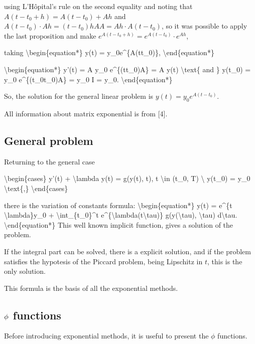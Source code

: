 \documentclass[letterpaper,10pt,english]{jupyterBook}
\begin{document}
\sphinxAtStartPar
using L’Hôpital’s rule on the second equality and noting that \(A(t-t_0+h) = A(t-t_0)+Ah\) and \(A(t-t_0) \cdot Ah = (t-t_0)hAA = Ah \cdot A(t-t_0)\), so it was possible to apply the last proposition and make \(e^{A(t-t_0+h)} = e^{A(t-t_0)} \cdot e^{Ah}\),

\sphinxAtStartPar
taking
\textbackslash{}begin\{equation*\}
y(t) = y\_0e\textasciicircum{}\{A(t\sphinxhyphen{}t\_0)\},
\textbackslash{}end\{equation*\}

\sphinxAtStartPar
\textbackslash{}begin\{equation*\}
y’(t) = A y\_0 e\textasciicircum{}\{(t\sphinxhyphen{}t\_0)A\} = A y(t) \textbackslash{}text\{ and \} y(t\_0) = y\_0 e\textasciicircum{}\{(t\_0\sphinxhyphen{}t\_0)A\} = y\_0 I = y\_0.
\textbackslash{}end\{equation*\}

\sphinxAtStartPar
So, the solution for the general linear problem is \(y(t)=y_0 e^{A(t-t_0)}\).

\sphinxAtStartPar
All information about matrix exponential is from {[}4{]}.


\subsection{General problem}
\label{\detokenize{cap3:general-problem}}
\sphinxAtStartPar
Returning to the general case

\sphinxAtStartPar
\textbackslash{}begin\{cases\}
y’(t) + \textbackslash{}lambda y(t) = g(y(t), t), t \textbackslash{}in (t\_0, T) \textbackslash{}
y(t\_0) = y\_0
\textbackslash{}text\{,\}
\textbackslash{}end\{cases\}

\sphinxAtStartPar
there is the variation of constants formula:
\textbackslash{}begin\{equation*\}
y(t) = e\textasciicircum{}\{\sphinxhyphen{}t \textbackslash{}lambda\}y\_0 + \textbackslash{}int\_\{t\_0\}\textasciicircum{}t e\textasciicircum{}\{\sphinxhyphen{}\textbackslash{}lambda(t\sphinxhyphen{}\textbackslash{}tau)\} g(y(\textbackslash{}tau), \textbackslash{}tau) d\textbackslash{}tau.
\textbackslash{}end\{equation*\}
This well known implicit function, gives a solution of the problem.

\sphinxAtStartPar
If the integral part can be solved, there is a explicit solution, and if the problem satisfies the hypotesis of the Piccard problem, being Lipschitz in \(t\), this is the only solution.

\sphinxAtStartPar
This formula is the basis of all the exponential methods.


\subsection{\protect\(\phi\protect\) functions}
\label{\detokenize{cap3:phi-functions}}
\sphinxAtStartPar
Before introducing exponential methods, it is useful to present the \(\phi\) functions.
\end{document}
